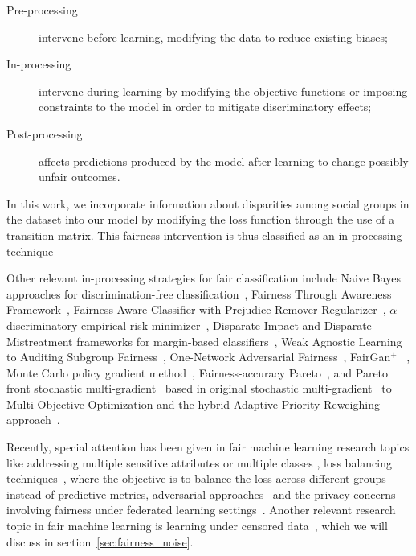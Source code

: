 \begin{description}
    \item[Pre-processing] intervene before learning, modifying the data to reduce existing biases;
    \item[In-processing] intervene during learning by modifying the objective functions or imposing constraints to the model in order to mitigate discriminatory effects;
    \item[Post-processing] affects predictions produced by the model after learning to change possibly unfair outcomes. 
\end{description}
In this work, we incorporate information about disparities among social groups in the dataset into our model by modifying the loss function through the use of a transition matrix. This fairness intervention is thus classified as an in-processing technique 

Other relevant in-processing strategies for fair classification include Naive Bayes approaches for discrimination-free classification~\citep{Calders2010}, Fairness Through Awareness Framework~\citep{Dwork2011}, Fairness-Aware Classifier with Prejudice Remover Regularizer~\cite{Kamishima2012}, $\alpha$-discriminatory empirical risk minimizer~\citep{Woodworth2017}, Disparate Impact and Disparate Mistreatment frameworks for margin-based classifiers~\citep{Zafar2017a,Zafar2017b}, Weak Agnostic Learning to Auditing Subgroup Fairness~\citep{pmlr-v80-kearns18a,Kearns2018}, One-Network Adversarial Fairness~\citep{Adel2019}, FairGan$^{+}$ ~\citep{Xu2019}, Monte Carlo policy gradient method~\citep{Petrovic2021}, Fairness-accuracy Pareto~\citep{Wei2022}, and Pareto front stochastic multi-gradient~\citep{Liu2022} based in original stochastic multi-gradient~\citep{Mercier2018} to Multi-Objective Optimization and the hybrid Adaptive Priority Reweighing approach~\cite{HuXT23}.

Recently, special attention has been given in fair machine learning research topics like addressing multiple sensitive attributes or multiple classes \cite{DAloisio2023,Liu_Wang_Wang_Wang_Su_Gao_2023}, loss balancing techniques~\cite{KIM2023231,KhaliliZA23}, where the objective is to balance the loss across different groups instead of predictive metrics, adversarial approaches~\cite{Liang2023,ZhangZLZY23,GrariLD23,MousaviMD23,Zeming2023,Yuchen2023} and the privacy concerns involving fairness under federated learning settings~\cite{ChenZZZY24,VucinichZ23}. Another relevant research topic in fair machine learning is learning under censored data~\cite{WZhang2022,WZhang2023_a,WZhang2023_b,WZhang2023_c}, which we will discuss in section~\ref{sec:fairness_noise}.


